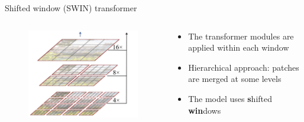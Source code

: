 \documentclass[xcolor=pdftex,dvipsnames,table,mathserif]{beamer}
\begin{document}
\begin{frame}{Shifted window (SWIN) transformer~\cite{liu_swin_2021}}


  \begin{columns}
    \begin{column}{.5\textwidth}
      \begin{figure}[ht]
        \centering
        \includegraphics[width=\textwidth]{swin_hierarchy}
      \end{figure}

    \end{column}

    \begin{column}{.5\textwidth}
      \begin{itemize}
      \item The transformer modules are applied within each window
      \item Hierarchical approach: patches are merged at some levels
      \item The model uses \textbf{s}hifted \textbf{win}dows
      \end{itemize}
    \end{column}
  \end{columns}



\end{frame}
\end{document}
